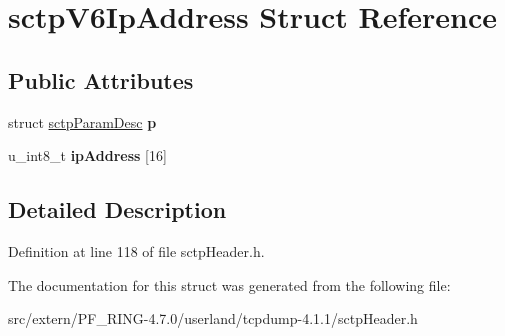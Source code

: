 \hypertarget{structsctp_v6_ip_address}{
\section{sctpV6IpAddress Struct Reference}
\label{structsctp_v6_ip_address}
}
\subsection*{Public Attributes}
\begin{DoxyCompactItemize}
\item 
\hypertarget{structsctp_v6_ip_address_a67ff8db1e3493b936ac51b72bb44b6b9}{
struct \hyperlink{structsctp_param_desc}{sctpParamDesc} {\bfseries p}}
\label{structsctp_v6_ip_address_a67ff8db1e3493b936ac51b72bb44b6b9}

\item 
\hypertarget{structsctp_v6_ip_address_a7212828bf92b1f3baa4e1ac3f7d57c6b}{
u\_\-int8\_\-t {\bfseries ipAddress} \mbox{[}16\mbox{]}}
\label{structsctp_v6_ip_address_a7212828bf92b1f3baa4e1ac3f7d57c6b}

\end{DoxyCompactItemize}


\subsection{Detailed Description}


Definition at line 118 of file sctpHeader.h.



The documentation for this struct was generated from the following file:\begin{DoxyCompactItemize}
\item 
src/extern/PF\_\-RING-\/4.7.0/userland/tcpdump-\/4.1.1/sctpHeader.h\end{DoxyCompactItemize}

